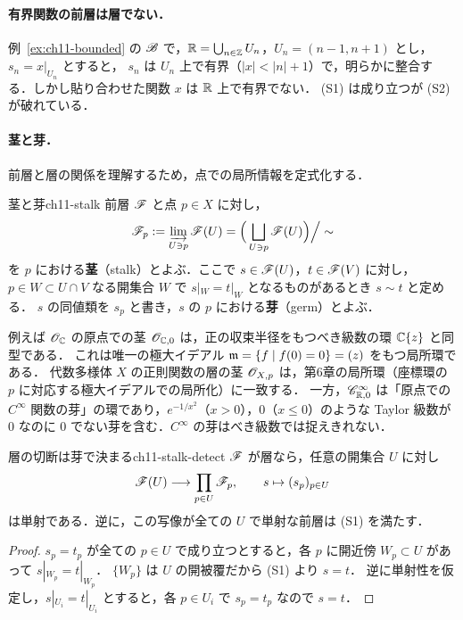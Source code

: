 \paragraph{有界関数の前層は層でない．}
例~\ref{ex:ch11-bounded} の $\mathscr{B}$ で，$\mathbb{R}=\bigcup_{n\in\mathbb{Z}}U_n$，$U_n=(n-1,n+1)$ とし，$s_n=x|_{U_n}$ とすると，
$s_n$ は $U_n$ 上で有界（$|x|<|n|+1$）で，明らかに整合する．しかし貼り合わせた関数 $x$ は $\mathbb{R}$ 上で有界でない．
(S1) は成り立つが (S2) が破れている．

\paragraph{茎と芽．}
前層と層の関係を理解するため，点での局所情報を定式化する．

\begin{mydef}{茎と芽}{ch11-stalk}
前層 $\mathscr{F}$ と点 $p\in X$ に対し，
\[
  \mathscr{F}_p := \varinjlim_{U\ni p}\mathscr{F}(U)
  = \Big(\bigsqcup_{U\ni p}\mathscr{F}(U)\Big)\Big/\sim
\]
を $p$ における\textbf{茎}（stalk）とよぶ．ここで $s\in\mathscr{F}(U)$，$t\in\mathscr{F}(V)$ に対し，$p\in W\subset U\cap V$ なる開集合 $W$ で $s|_W=t|_W$ となるものがあるとき $s\sim t$ と定める．
$s$ の同値類を $s_p$ と書き，$s$ の $p$ における\textbf{芽}（germ）とよぶ．
\end{mydef}

例えば $\mathscr{O}_{\mathbb{C}}$ の原点での茎 $\mathscr{O}_{\mathbb{C},0}$ は，正の収束半径をもつべき級数の環 $\mathbb{C}\{z\}$ と同型である．
これは唯一の極大イデアル $\mathfrak{m}=\{f\mid f(0)=0\}=(z)$ をもつ局所環である．
代数多様体 $X$ の正則関数の層の茎 $\mathscr{O}_{X,p}$ は，第6章の局所環（座標環の $p$ に対応する極大イデアルでの局所化）に一致する．
一方，$\mathscr{C}^\infty_{\mathbb{R},0}$ は「原点での $C^\infty$ 関数の芽」の環であり，$e^{-1/x^2}$（$x>0$），$0$（$x\le0$）のような
Taylor 級数が $0$ なのに $0$ でない芽を含む．$C^\infty$ の芽はべき級数では捉えきれない．

\begin{myprop}{層の切断は芽で決まる}{ch11-stalk-detect}
$\mathscr{F}$ が層なら，任意の開集合 $U$ に対し
\[
  \mathscr{F}(U)\longrightarrow \prod_{p\in U}\mathscr{F}_p,\qquad s\mapsto (s_p)_{p\in U}
\]
は単射である．逆に，この写像が全ての $U$ で単射な前層は (S1) を満たす．
\end{myprop}
\begin{proof}
$s_p=t_p$ が全ての $p\in U$ で成り立つとすると，各 $p$ に開近傍 $W_p\subset U$ があって $s|_{W_p}=t|_{W_p}$．
$\{W_p\}$ は $U$ の開被覆だから (S1) より $s=t$．
逆に単射性を仮定し，$s|_{U_i}=t|_{U_i}$ とすると，各 $p\in U_i$ で $s_p=t_p$ なので $s=t$．
\end{proof}


